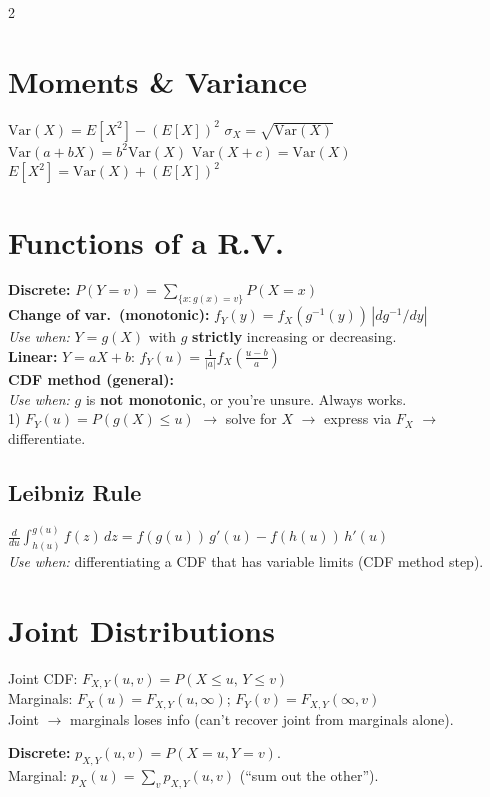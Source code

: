 \documentclass[10pt]{article}
\begin{document}
\begin{multicols*}{2}
\section{Moments \& Variance}
$\text{Var}(X) = E[X^2] - (E[X])^2$ \qquad $\sigma_X = \sqrt{\text{Var}(X)}$ \\
$\text{Var}(a + bX) = b^2 \text{Var}(X)$ \quad $\text{Var}(X + c) = \text{Var}(X)$ \\
$E[X^2] = \text{Var}(X) + (E[X])^2$

\section{Functions of a R.V.}
\textbf{Discrete:} $P(Y\!=\!v) = \sum_{\{x: g(x)=v\}} P(X\!=\!x)$ \\
\textbf{Change of var.\ (monotonic):} $f_Y(y) = f_X(g^{-1}(y))\,|d g^{-1}/dy|$ \\
\textit{Use when:} $Y = g(X)$ with $g$ \textbf{strictly} increasing or decreasing. \\
\textbf{Linear:} $Y = aX+b$: $f_Y(u) = \frac{1}{|a|} f_X\!\left(\frac{u-b}{a}\right)$ \\
\textbf{CDF method (general):} \\
\textit{Use when:} $g$ is \textbf{not monotonic}, or you're unsure. Always works. \\
1) $F_Y(u) = P(g(X) \le u)$ $\to$ solve for $X$ $\to$ express via $F_X$ $\to$ differentiate.

\subsection{Leibniz Rule}
$\frac{d}{du}\!\int_{h(u)}^{g(u)}\! f(z)\,dz = f(g(u))\,g'(u) - f(h(u))\,h'(u)$ \\
\textit{Use when:} differentiating a CDF that has variable limits (CDF method step).

\section{Joint Distributions}
Joint CDF: $F_{X,Y}(u,v) = P(X \le u,\, Y \le v)$ \\
Marginals: $F_X(u) = F_{X,Y}(u, \infty)$;\; $F_Y(v) = F_{X,Y}(\infty, v)$ \\
Joint $\to$ marginals loses info (can't recover joint from marginals alone).

\textbf{Discrete:} $p_{X,Y}(u,v) = P(X\!=\!u, Y\!=\!v)$. \\
Marginal: $p_X(u) = \sum_v p_{X,Y}(u,v)$ (``sum out the other'').


\end{multicols*}
\end{document}
